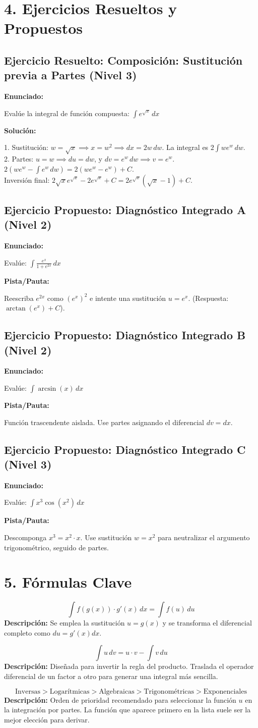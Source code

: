 \documentclass[11pt]{article}
\newenvironment{ejercicios}{\section*{4. Ejercicios Resueltos y Propuestos}}{}
\newenvironment{ejercicioresuelto}[2]{\subsection*{Ejercicio Resuelto: #1 \hfill \normalfont\small(#2)}}{ }
\newcommand{\enunciado}[1]{\textbf{Enunciado:}\par#1\par\medskip}
\newcommand{\solucion}[1]{\textbf{Solución:}\par#1\par\bigskip}
\newenvironment{ejerciciopropuesto}[2]{\subsection*{Ejercicio Propuesto: #1 \hfill \normalfont\small(#2)}}{ }
\newcommand{\pista}[1]{\textbf{Pista/Pauta:}\par#1\par\bigskip}
\newenvironment{formulas}{\section*{5. Fórmulas Clave}}{}
\newcommand{\formula}[3]{\begin{tcolorbox}[colback=violet!5,colframe=violet!75!black,title=#1]\centering\[ #2 \]\tcblower\flushleft\small\textbf{Descripción:} #3\end{tcolorbox}}
\begin{document}
\begin{ejercicios}
  \begin{ejercicioresuelto}{Composición: Sustitución previa a Partes}{Nivel 3}
    \enunciado{Evalúe la integral de función compuesta: $\displaystyle\int e^{\sqrt{x}} \, dx$}
    \solucion{
      1. Sustitución: $\displaystyle w = \sqrt{x} \implies x = w^2 \implies dx = 2w \, dw$. La integral es $\displaystyle 2 \displaystyle\int w e^w \, dw$. \\
      2. Partes: $\displaystyle u = w \implies du = dw$, y $\displaystyle dv = e^w \, dw \implies v = e^w$. \\
      $\displaystyle 2 \left( w e^w - \displaystyle\int e^w \, dw \right) = 2(w e^w - e^w) + C$. \\
      Inversión final: $\displaystyle 2\sqrt{x}e^{\sqrt{x}} - 2e^{\sqrt{x}} + C = 2e^{\sqrt{x}}(\sqrt{x} - 1) + C$.
    }
  \end{ejercicioresuelto}

  \begin{ejerciciopropuesto}{Diagnóstico Integrado A}{Nivel 2}
    \enunciado{Evalúe: $\displaystyle\int \frac{e^x}{1 + e^{2x}} \, dx$}
    \pista{Reescriba $e^{2x}$ como $(e^x)^2$ e intente una sustitución $u = e^x$. (Respuesta: $\arctan(e^x) + C$).}
  \end{ejerciciopropuesto}

  \begin{ejerciciopropuesto}{Diagnóstico Integrado B}{Nivel 2}
    \enunciado{Evalúe: $\displaystyle\int \arcsin(x) \, dx$}
    \pista{Función trascendente aislada. Use partes asignando el diferencial $dv = dx$.}
  \end{ejerciciopropuesto}
  
  \begin{ejerciciopropuesto}{Diagnóstico Integrado C}{Nivel 3}
    \enunciado{Evalúe: $\displaystyle\int x^3 \cos(x^2) \, dx$}
    \pista{Descomponga $x^3 = x^2 \cdot x$. Use sustitución $w = x^2$ para neutralizar el argumento trigonométrico, seguido de partes.}
  \end{ejerciciopropuesto}

\end{ejercicios}

\begin{formulas}

  \formula{Teorema del Cambio de Variable (Sustitución)}
    {\displaystyle\int f(g(x)) \cdot g'(x) \, dx = \displaystyle\int f(u) \, du}
    {Se emplea la sustitución $u = g(x)$ y se transforma el diferencial completo como $du = g'(x)dx$.}

  \formula{Teorema de Integración por Partes}
    {\displaystyle\int u \, dv = u \cdot v - \displaystyle\int v \, du}
    {Diseñada para invertir la regla del producto. Traslada el operador diferencial de un factor a otro para generar una integral más sencilla.}

  \formula{Regla Heurística ILATE (Elección de $u$)}
    {\text{Inversas} > \text{Logarítmicas} > \text{Algebraicas} > \text{Trigonométricas} > \text{Exponenciales}}
    {Orden de prioridad recomendado para seleccionar la función $u$ en la integración por partes. La función que aparece primero en la lista suele ser la mejor elección para derivar.}

\end{formulas}
\end{document}
